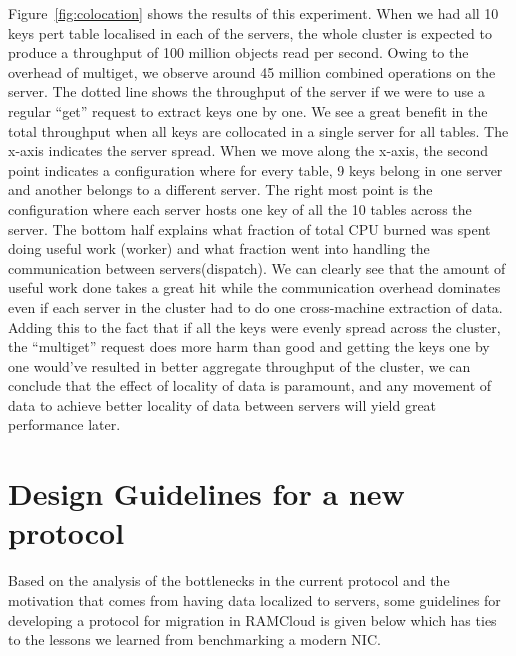 Figure~\ref{fig:colocation} shows the results of this experiment. When we had all 10 keys pert table localised in each of the servers, the whole cluster is expected to produce a throughput of 100 million objects read per second.
Owing to the overhead of multiget, we observe around 45 million combined operations on the server. The dotted line shows the throughput of the server if we were to use a regular ``get'' request to extract keys one by one.
We see a great benefit in the total throughput when all keys are collocated in a single server for all tables. The x-axis indicates the server spread. When we move along the x-axis, the second point indicates a configuration where for every table, 9 keys belong in one server and 
another belongs to a different server. The right most point is the configuration where each server hosts one key of all the 10 tables across the server. The bottom half explains what fraction of total CPU burned was spent 
doing useful work (worker) and what fraction went into handling the communication between servers(dispatch). 
We can clearly see that the amount of useful work done takes a great hit while the communication overhead dominates 
even if each server in the cluster had to do one cross-machine extraction of data. Adding this to the fact that if all the keys were evenly spread across the cluster, the ``multiget'' request does more harm than good and getting the 
keys one by one would've resulted in better aggregate throughput of the cluster, we can conclude that the effect of locality of data is paramount, and any movement of data to achieve better locality of data between servers will yield 
great performance later.
\section{Design Guidelines for a new protocol}
Based on the analysis of the bottlenecks in the current protocol and the motivation that comes from having data localized to servers, some guidelines for developing a protocol for migration in RAMCloud
is given below which has ties to the lessons we learned from benchmarking a modern NIC.

